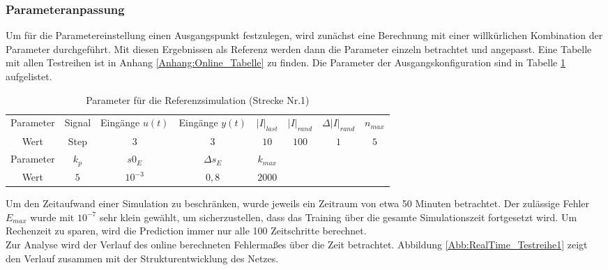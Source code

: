             \subsubsection{Parameteranpassung}
                Um für die Parametereinstellung einen Ausgangspunkt festzulegen, wird zunächst eine Berechnung mit einer willkürlichen Kombination der Parameter durchgeführt. Mit diesen 
                Ergebnissen als Referenz werden dann die Parameter einzeln betrachtet und angepasst. Eine Tabelle mit allen Testreihen ist in Anhang \ref{Anhang:Online_Tabelle} zu finden. Die Parameter 
                der Ausgangskonfiguration sind in Tabelle \ref{Tab:ParameterRef} aufgelistet.
                \begin{table}[h]
                    \begin{tabular}{c||ccccccc}
                        Parameter &Signal&Eingänge $u(t)$&Eingänge $y(t)$&$|I|_{last}$&$|I|_{rand}$&$\Delta|I|_{rand}$&$n_{max}$\\
                        Wert &Step&$3$&$3$&$10$&$100$&$1$&$5$\\
                        \hline
                        \hline
                        Parameter &$k_{p}$&$s0_{E}$&$\Delta s_{E}$&$k_{max}$&&&\\
                        Wert &$5$&$10^{-3}$&$0{,}8$&$2000$&&&\\
                    \end{tabular}
                    \centering
                    \caption{Parameter für die Referenzsimulation (Strecke Nr.1)}
                    \label{Tab:ParameterRef}
                \end{table}
                Um den Zeitaufwand einer Simulation zu beschränken, wurde jeweils ein Zeitraum von etwa 50 Minuten betrachtet. Der zulässige Fehler $E_{max}$ wurde mit $10^{-7}$ sehr klein gewählt,
                um sicherzustellen, dass das Training über die gesamte Simulationszeit fortgesetzt wird. Um Rechenzeit zu sparen, wird die Prediction immer nur alle 100 Zeitschritte berechnet.\\
                Zur Analyse wird der Verlauf des online berechneten Fehlermaßes über die Zeit betrachtet. Abbildung \ref{Abb:RealTime_Testreihe1} 
                zeigt den Verlauf zusammen mit der Strukturentwicklung des Netzes. 

